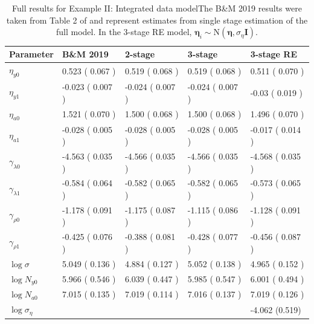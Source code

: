 \documentclass[12pt]{article}
\newcommand{\bn}{\boldsymbol{\eta}}
\newcommand{\tN}{\text{N}}
\newcommand{\bI}{\mathbf{I}}
\begin{document}
\begin{table}[!h]
\caption{Full results for Example II: Integrated data modelThe B\&M 2019 results were taken from Table 2 of \citet{besbeas2019exact} and represent estimates from single stage estimation of the full model. In the 3-stage RE model, $\bn_i \sim \tN(\bn,\sigma_{\eta}\bI)$.} \medskip
\begin{tabular}{lllll}
\hline \hline
Parameter & B\&M 2019 & 2-stage & 3-stage & 3-stage RE\\
\hline
$\eta_{y0}$ & 0.523  ( 0.067 ) & 0.519  ( 0.068 ) & 0.519  ( 0.068 ) & 0.511  ( 0.070 )\\
$\eta_{y1}$ & -0.023  ( 0.007 ) & -0.024  ( 0.007 ) & -0.024  ( 0.007 ) & -0.03  ( 0.019 )\\
$\eta_{a0}$ & 1.521  ( 0.070 ) & 1.500  ( 0.068 ) & 1.500  ( 0.068 ) & 1.496  ( 0.070 )\\
$\eta_{a1}$ & -0.028  ( 0.005 ) & -0.028  ( 0.005 ) & -0.028  ( 0.005 ) & -0.017  ( 0.014 ) \bigskip\\
$\gamma_{\lambda 0}$ & -4.563  ( 0.035 ) & -4.566  ( 0.035 ) & -4.566  ( 0.035 ) & -4.568  ( 0.035 )\\
$\gamma_{\lambda 1}$ & -0.584  ( 0.064 ) & -0.582  ( 0.065 ) & -0.582  ( 0.065 ) & -0.573  ( 0.065 )\\
$\gamma_{\rho 0}$ & -1.178  ( 0.091 ) & -1.175  ( 0.087 ) & -1.115  ( 0.086 ) & -1.128  ( 0.091 )\\
$\gamma_{\rho 1}$ & -0.425  ( 0.076 ) & -0.388  ( 0.081 ) & -0.428  ( 0.077 ) & -0.456  ( 0.087 ) \bigskip \\
$\log \sigma$ & 5.049  ( 0.136 ) & 4.884  ( 0.127 ) & 5.052  ( 0.138 ) & 4.965  ( 0.152 )\\
$\log N_{y0}$ & 5.966  ( 0.546 ) & 6.039  ( 0.447 ) & 5.985  ( 0.547 ) & 6.001  ( 0.494 )\\
$\log N_{a0}$ & 7.015  ( 0.135 ) & 7.019  ( 0.114 ) & 7.016  ( 0.137 ) & 7.019  ( 0.126 )\\
$\log \sigma_\eta$&  & & & -4.062 (0.519)\\
\hline
\end{tabular}
\end{table}
\end{document}
